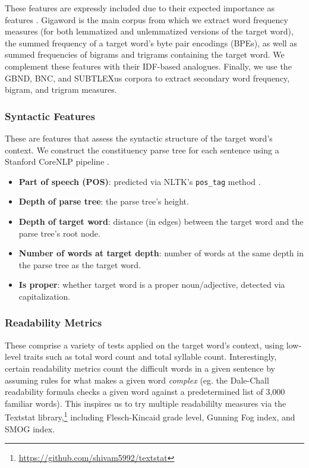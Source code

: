 \documentclass{dcthesis}
\theoremstyle{definition}
\theoremstyle{remark}
\begin{document}
These features are expressly included due to their expected importance as features \citep{zampieri2017complex}. Gigaword is the main corpus from which we extract word frequency measures (for both lemmatized and unlemmatized versions of the target word), the summed frequency of a target word's byte pair encodings (BPEs), as well as summed frequencies of bigrams and trigrams containing the target word. We complement these features with their IDF-based analogues. Finally, we use the GBND, BNC, and SUBTLEXus corpora to extract secondary word frequency, bigram, and trigram measures. 

\subsubsection{Syntactic Features}

These are features that assess the syntactic structure of the target word's context. We construct the constituency parse tree for each sentence using a Stanford CoreNLP pipeline \citep{manning2014stanford}.

\begin{itemize}
  \item \textbf{Part of speech (POS)}: predicted via NLTK's \texttt{pos\_tag} method \citep{bird2009natural}.
  \item \textbf{Depth of parse tree}: the parse tree's height.
  \item \textbf{Depth of target word}: distance (in edges) between the target word and the parse tree's root node.
  \item \textbf{Number of words at target depth}: number of words at the same depth in the parse tree as the target word.
  \item \textbf{Is proper}: whether target word is a proper noun/adjective, detected via capitalization.
\end{itemize}

\subsubsection{Readability Metrics}

These comprise a variety of tests applied on the target word's context, using low-level traits such as total word count and total syllable count. Interestingly, certain readability metrics count the difficult words in a given sentence by assuming rules for what makes a given word \textit{complex} (eg. the Dale-Chall readability formula \citep{dale1948formula} checks a given word against a predetermined list of 3,000 familiar words). This inspires us to try multiple readabililty measures via the Textstat library,\footnote{\url{https://github.com/shivam5992/textstat}} including Flesch-Kincaid grade level, Gunning Fog index, and SMOG index.
\end{document}
